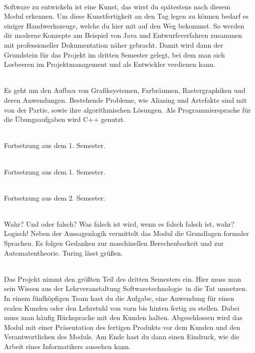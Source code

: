 \textbf{} \\
Software zu entwickeln ist eine Kunst, das wirst du spätestens nach diesem Modul erkennen.
Um diese Kunstfertigkeit an den Tag legen zu können bedarf es einiger Handwerkszeuge, welche du hier mit auf den Weg bekommst.
So werden dir moderne Konzepte am Beispiel von Java und Entwurfsverfahren zusammen mit professioneller Dokumentation näher gebracht.
Damit wird dann der Grundstein für das Projekt im dritten Semester gelegt, bei dem man sich Lorbeeren im Projektmanagement und als Entwickler verdienen kann.

\textbf{} \\
Es geht um den Aufbau von Grafiksystemen, Farbräumen, Rastergraphiken und deren Anwendungen.
Bestehende Probleme, wie Aliasing und Artefakte sind mit von der Partie, sowie ihre algorithmischen Lösungen.
Als Programmiersprache für die Übungsaufgaben wird C++ genutzt.

\textbf{} \\
Fortsetzung aus dem 1. Semester.

\textbf{} \\
Fortsetzung aus dem 1. Semester.



\textbf{} \\
Fortsetzung aus dem 2. Semester.

\textbf{} \\
Wahr?
Und oder falsch?
Was falsch ist wird, wenn es falsch falsch ist, wahr?
Logisch!
Neben der Aussagenlogik vermittelt das Modul die Grundlagen formaler Sprachen.
Es folgen Gedanken zur maschinellen Berechenbarkeit und zur Automatentheorie.
Turing lässt grüßen.

\newpage %

\textbf{} \\
Das Projekt nimmt den größten Teil des dritten Semesters ein.
Hier muss man sein Wissen aus der Lehrveranstaltung \glqq Softwaretechnologie\grqq\ in die Tat umsetzen.
In einem fünfköpfigen Team hast du die Aufgabe, eine Anwendung für einen realen Kunden oder den Lehrstuhl von vorn bis hinten fertig zu stellen.
Dabei muss man häufig Rücksprache mit den Kunden halten.
Abgeschlossen wird das Modul mit einer Präsentation des fertigen Produkts vor dem Kunden und den Verantwortlichen des Moduls.
Am Ende hast du dann einen Eindruck, wie die Arbeit eines Informatikers aussehen kann.

